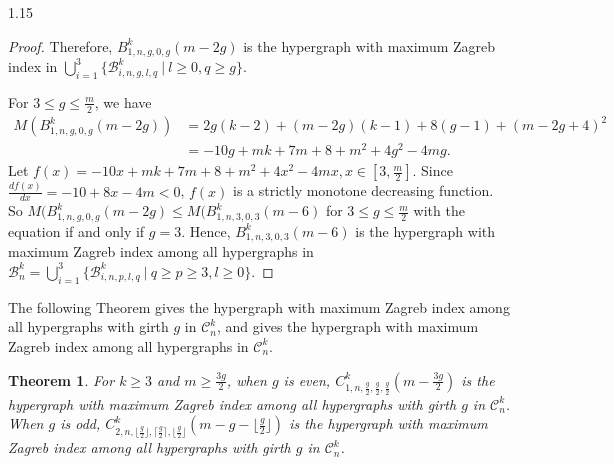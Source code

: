 \documentclass[preprint,12pt]{elsarticle1}
\newtheorem{thm}{Theorem}[section]
\numberwithin{equation}{section}
\begin{document}
\begin{spacing}{1.15}
\begin{proof}
Therefore, $B_{1,n,g,0,g}^{k}(m-2g)$ is the hypergraph with maximum Zagreb index in
$\bigcup_{i=1}^{3}\{\mathcal{B}_{i,n,g,l,q}^{k}~|~l\geq0,q\geq g\}$.

For $3\leq g\leq\frac{m}{2}$, we have
\begin{align*}
M(B_{1,n,g,0,g}^{k}(m-2g))&=2g(k-2)+(m-2g)(k-1)+8(g-1)+(m-2g+4)^{2}\\
&=-10g+mk+7m+8+m^{2}+4g^{2}-4mg.
\end{align*}
Let $f(x)=-10x+mk+7m+8+m^{2}+4x^{2}-4mx, x\in[3,\frac{m}{2}].$ Since $\frac{df(x)}{dx}=-10+8x-4m<0$, $f(x)$ is a strictly monotone decreasing function. So $M(B_{1,n,g,0,g}^{k}(m-2g)\leq M(B_{1,n,3,0,3}^{k}(m-6)$ for $3\leq g\leq\frac{m}{2}$ with the equation if and only if $g=3$. Hence, $B_{1,n,3,0,3}^{k}(m-6)$ is the hypergraph with maximum Zagreb index among all hypergraphs in $\mathcal{B}_{n}^{k}=\bigcup_{i=1}^{3}\{\mathcal{B}_{i,n,p,l,q}^{k}~|~q\geq p\geq3,l\geq 0\}$.

\end{proof}

The following Theorem gives the hypergraph with maximum Zagreb index among  all hypergraphs with girth $g$ in $\mathcal{C}_{n}^{k}$, and gives the hypergraph with maximum Zagreb index among all hypergraphs in $\mathcal{C}_{n}^{k}$.
\begin{thm}\label{q1}
For $k\geq3$ and $m\geq \frac{3g}{2}$, when $g$ is even, $C_{1,n,\frac{g}{2},\frac{g}{2},\frac{g}{2}}^{k}(m-\frac{3g}{2})$ is the hypergraph with maximum Zagreb index among all hypergraphs with girth $g$ in $\mathcal{C}_{n}^{k}$.
When $g$ is odd, $C_{2,n,\lfloor\frac{g}{2}\rfloor,\lceil\frac{g}{2}\rceil,\lfloor\frac{g}{2}\rfloor}^{k}(m-g-\lfloor\frac{g}{2}\rfloor)$ is the hypergraph with maximum Zagreb index among all  hypergraphs with girth $g$ in $\mathcal{C}_{n}^{k}$.


\end{thm}
\end{spacing}
\end{document}
